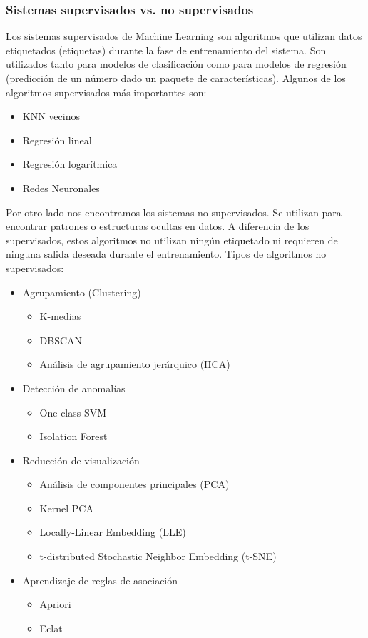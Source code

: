 \documentclass[12pt,a4paper,Spanish]{article}
\begin{document}
\subsubsection{Sistemas supervisados vs. no supervisados}
Los sistemas supervisados de Machine Learning son algoritmos que utilizan datos etiquetados (etiquetas) durante la fase de entrenamiento del sistema. Son utilizados tanto para modelos de clasificación como para modelos de regresión (predicción de un número dado un paquete de características). Algunos de los algoritmos supervisados más importantes son:
\begin{itemize}
	\item KNN vecinos
	\item Regresión lineal
	\item Regresión logarítmica
	\item Redes Neuronales	
\end{itemize}
Por otro lado nos encontramos los sistemas no supervisados. Se utilizan para encontrar patrones o estructuras ocultas en datos. A diferencia de los supervisados, estos algoritmos no utilizan ningún etiquetado ni requieren de ninguna salida deseada durante el entrenamiento. Tipos de algoritmos no supervisados:
\begin{itemize}
	\item Agrupamiento (Clustering)
	\begin{itemize}
		\item K-medias
		\item DBSCAN
		\item Análisis de agrupamiento jerárquico (HCA)	
	\end{itemize}
	\item Detección de anomalías
	\begin{itemize}
		\item One-class SVM
		\item Isolation Forest	
	\end{itemize}
	\item Reducción de visualización
	\begin{itemize}
		\item Análisis de componentes principales (PCA)
		\item Kernel PCA	
		\item Locally-Linear Embedding (LLE)
		\item t-distributed Stochastic Neighbor Embedding (t-SNE)
	\end{itemize}
	\item Aprendizaje de reglas de asociación
	\begin{itemize}
		\item Apriori
		\item Eclat	
	\end{itemize}	
\end{itemize}
\end{document}
